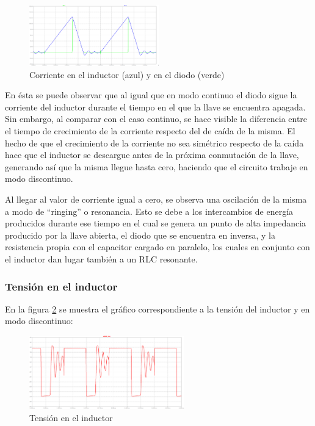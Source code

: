 \documentclass[e4_tp1_main.tex]{subfiles}
\begin{document}
	\begin{figure}
		\centering
		\includegraphics[width=0.5\textwidth]{images/ej4/fig3.png}
		\caption{Corriente en el inductor (azul) y en el diodo (verde)}
		\label{fig:Corriente_inductor_DCM}
	\end{figure}
	
	En ésta se puede observar que al igual que en modo continuo el diodo sigue la corriente del inductor durante el tiempo en el que la llave se encuentra apagada. Sin embargo, al comparar con el caso continuo, se hace visible la diferencia entre el tiempo de crecimiento de la corriente respecto del de caída de la misma. El hecho de que el crecimiento de la corriente no sea simétrico respecto de la caída hace que el inductor se descargue antes de la próxima conmutación de la llave, generando así que la misma llegue hasta cero, haciendo que el circuito trabaje en modo discontinuo.
	
	Al llegar al valor de corriente igual a cero, se observa una oscilación de la misma a modo de ``ringing'' o resonancia. Esto se debe a los intercambios de energía producidos durante ese tiempo en el cual se genera un punto de alta impedancia producido por la llave abierta, el diodo que se encuentra en inversa, y la resistencia propia con el capacitor cargado en paralelo, los cuales en conjunto con el inductor dan lugar también a un RLC resonante.
	
	\subsubsection{Tensión en el inductor}
	En la figura \ref{fig:Tensión_inductor_DCM} se muestra el gráfico correspondiente a la tensión del inductor y en modo discontinuo:
	\begin{figure}
		\centering
		\includegraphics[width=0.6\textwidth]{images/ej4/fig4.png}
		\caption{Tensión en el inductor}
		\label{fig:Tensión_inductor_DCM}
	\end{figure}
		
\end{document}
